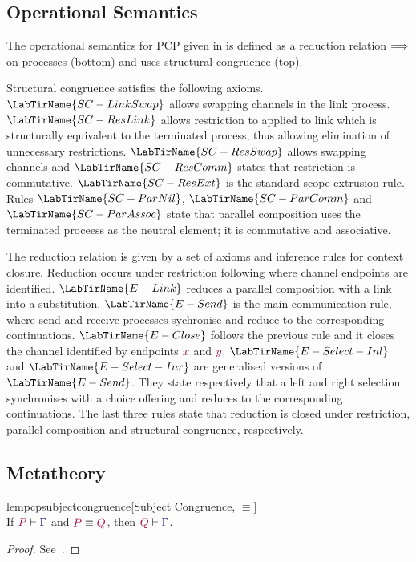 \documentclass[main.tex]{subfiles}
\begin{document}
\subsection{Operational Semantics}


The operational semantics for PCP given in  is defined as a reduction relation $\Longrightarrow$ on processes (bottom) and uses structural congruence (top).

Structural congruence satisfies the following axioms. $\LabTirName{SC-LinkSwap}$ allows swapping channels in the link process. $\LabTirName{SC-ResLink}$ allows restriction to applied to link which is structurally equivalent to the terminated process, thus allowing elimination of unnecessary restrictions. $\LabTirName{SC-ResSwap}$ allows swapping channels and $\LabTirName{SC-ResComm}$ states that restriction is commutative. $\LabTirName{SC-ResExt}$ is the standard scope extrusion rule. Rules $\LabTirName{SC-ParNil}$, $\LabTirName{SC-ParComm}$ and $\LabTirName{SC-ParAssoc}$ state that parallel composition uses the terminated proceess as the neutral element; it is commutative and associative.

The reduction relation is given by a set of axioms and inference rules for context closure. Reduction occurs under restriction following \cite{dardhagay18} where channel endpoints are identified.
$\LabTirName{E-Link}$ reduces a parallel composition with a link into a substitution. $\LabTirName{E-Send}$ is the main communication rule, where send and receive processes sychronise and reduce to the corresponding continuations. $\LabTirName{E-Close}$ follows the previous rule and it closes the channel identified by endpoints $\tm x$ and $\tm y$. $\LabTirName{E-Select-Inl}$ and $\LabTirName{E-Select-Inr}$ are generalised versions of $\LabTirName{E-Send}$. They state respectively that a left and right selection synchronises with a choice offering and reduces to the corresponding continuations. The last three rules state that reduction is closed under restriction, parallel composition and structural congruence, respectively. 


\subsection{Metatheory}

\begin{restatablelemma}{lempcpsubjectcongruence}[Subject Congruence, $\equiv$]
  \label{lem:pcp-subject-congruence}
  \hfill\\%
  If $\seq{P}{\ty{\Gamma}}$ and $\tm{P}\equiv\tm{Q}$,
  then $\seq{Q}{\ty{\Gamma}}$.
\end{restatablelemma}
\begin{proof}
  See~\cite{dardhagay18}.
\end{proof}
\end{document}
